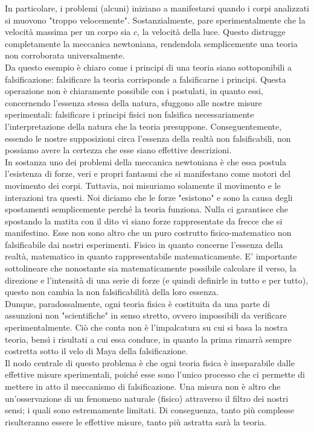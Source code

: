 \documentclass[]{article}
\begin{document}
	In particolare, i problemi (alcuni) iniziano a manifestarsi quando i corpi analizzati si muovono "troppo velocemente". Sostanzialmente, pare sperimentalmente che la velocità massima per un corpo sia $c$, la velocità della luce. Questo distrugge completamente la meccanica newtoniana, rendendola semplicemente una teoria non corroborata universalmente.\\
	Da questo esempio è chiaro come i principi di una teoria siano sottoponibili a falsificazione: falsificare la teoria corrisponde a falsificarne i principi. Questa operazione non è chiaramente possibile con i postulati, in quanto essi, concernendo l'essenza stessa della natura, sfuggono alle nostre misure sperimentali: falsificare i principi fisici non falsifica necessariamente l'interpretazione della natura che la teoria presuppone. Conseguentemente, essendo le nostre supposizioni circa l'essenza della realtà non falsificabili, non possiamo avere la certezza che esse siano effettive descrizioni.  
	\\
	In sostanza uno dei problemi della meccanica newtoniana è che essa postula l'esistenza di forze, veri e propri fantasmi che si manifestano come motori del movimento dei corpi. Tuttavia, noi misuriamo solamente il movimento e le interazioni tra questi. Noi diciamo che le forze "esistono" e sono la causa degli spostamenti semplicemente perché la teoria funziona. Nulla ci garantisce che spostando la matita con il dito vi siano forze rappresentate da frecce che si manifestino. Esse non sono altro che un puro costrutto fisico-matematico non falsificabile dai nostri esperimenti. Fisico in quanto concerne l'essenza della realtà, matematico in quanto rappresentabile matematicamente. E' importante sottolineare che nonostante sia matematicamente possibile calcolare il verso, la direzione e l'intensità di una serie di forze (e quindi definirle in tutto e per tutto), questo non cambia la non falsificabilità della loro essenza.\\
	Dunque, paradossalmente, ogni teoria fisica è costituita da una parte di assunzioni non "scientifiche" in senso stretto, ovvero impossibili da verificare sperimentalmente. Ciò che conta non è l'impalcatura su cui si basa la nostra teoria, bensì i risultati a cui essa conduce, in quanto la prima rimarrà sempre costretta sotto il velo di Maya della falsificazione.\\
	Il nodo centrale di questo problema è che ogni teoria fisica è inseparabile dalle effettive misure sperimentali, poiché esse sono l'unico processo che ci permette di mettere in atto il meccanismo di falsificazione. Una misura non è altro che un'osservazione di un fenomeno naturale (fisico) attraverso il filtro dei nostri sensi; i quali sono estremamente limitati. Di conseguenza, tanto più complesse risulteranno essere le effettive misure, tanto più astratta sarà la teoria. \\
\end{document}
